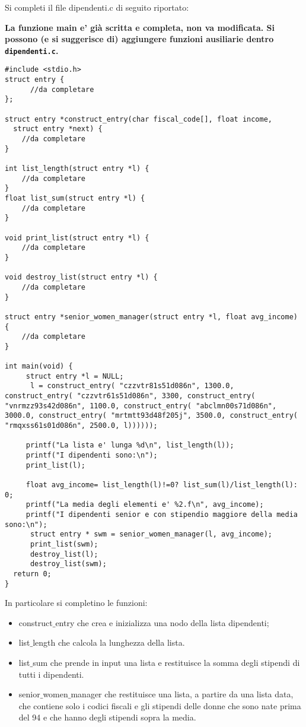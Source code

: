 \documentclass[12pt]{article}
\begin{document}
Si completi il file dipendenti.c di seguito riportato:
%
\begin{mdframed}[backgroundcolor=myLightBlue] 
  \vspace*{-0.5ex}
  \textbf{La funzione main e' gi\`a scritta e completa, non va modificata. Si possono (e si suggerisce di) aggiungere funzioni ausiliarie dentro \texttt{dipendenti.c}.}
\end{mdframed}
%
\begin{lstlisting}[language=myC]
#include <stdio.h>
struct entry {
	  //da completare
};

struct entry *construct_entry(char fiscal_code[], float income,
  struct entry *next) {
	//da completare
}

int list_length(struct entry *l) {
	//da completare
}
float list_sum(struct entry *l) {
	//da completare
}

void print_list(struct entry *l) {
 	//da completare
}

void destroy_list(struct entry *l) {
 	//da completare
}

struct entry *senior_women_manager(struct entry *l, float avg_income) {
	//da completare
}

int main(void) {
	 struct entry *l = NULL;
      l = construct_entry( "czzvtr81s51d086n", 1300.0, construct_entry( "czzvtr61s51d086n", 3300, construct_entry( "vnrmzz93s42d086n", 1100.0, construct_entry( "abclmn00s71d086n", 3000.0, construct_entry( "mrtmtt93d48f205j", 3500.0, construct_entry( "rmqxss61s01d086n", 2500.0, l))))));
	  
	 printf("La lista e' lunga %d\n", list_length(l));
	 printf("I dipendenti sono:\n");
	 print_list(l);
	 
	 float avg_income= list_length(l)!=0? list_sum(l)/list_length(l): 0;
	 printf("La media degli elementi e' %2.f\n", avg_income);
	 printf("I dipendenti senior e con stipendio maggiore della media sono:\n");
	  struct entry * swm = senior_women_manager(l, avg_income);
	  print_list(swm);
	  destroy_list(l);
	  destroy_list(swm);
  return 0;
}
\end{lstlisting}
In particolare si completino le funzioni:
\begin{itemize}
\item construct$\_$entry  che crea e inizializza una nodo della lista dipendenti;
\item list$\_$length che calcola la lunghezza della lista.
\item list$\_$sum che prende in input una lista e restituisce la somma degli stipendi di tutti i dipendenti.
\item senior$\_$women$\_$manager che restituisce una lista, a partire da una lista data, che contiene solo i codici fiscali e gli stipendi delle donne che sono nate prima del 94 e che hanno degli stipendi sopra la media.
\end{itemize}
\end{document}
